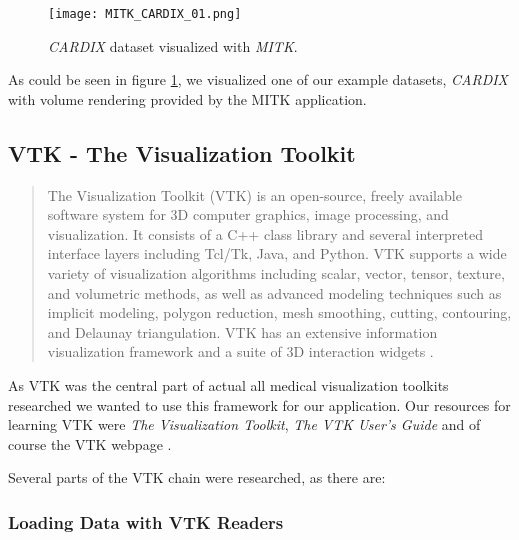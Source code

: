 
\begin{figure}[h]
	\centering
	\texttt{[image: MITK\_CARDIX\_01.png]} \\
	\caption{ \emph{CARDIX}\cite{gimias_sampledata_2018} dataset visualized with \emph{MITK}.}
	\label{fig:MITK_CARDIX_01}
\end{figure}

As could be seen in figure \ref{fig:MITK_CARDIX_01}, we visualized one of our example datasets, \emph{CARDIX} with volume rendering provided by the MITK application.


\subsection{VTK - The Visualization Toolkit}
\label{seq:VTK}

\blockquote{The Visualization Toolkit (VTK) is an open-source, freely available software system for 3D computer graphics, image processing, and visualization. It consists of a C++ class library and several interpreted interface layers including Tcl/Tk, Java, and Python. VTK supports a wide variety of visualization algorithms including scalar, vector, tensor, texture, and volumetric methods, as well as advanced modeling techniques such as implicit modeling, polygon reduction, mesh smoothing, cutting, contouring, and Delaunay triangulation. VTK has an extensive information visualization framework and a suite of 3D interaction widgets \cite{vtk_2018}.}

As VTK was the central part of actual all medical visualization toolkits researched we wanted to use this framework for our application.
Our resources for learning VTK were \emph{The Visualization Toolkit}\cite{schroeder2004visualization}, \emph{The VTK User's Guide}\cite{avila2010vtk} and of course the VTK webpage \cite{vtk_2018}.

Several parts of the VTK chain were researched, as there are:

\subsubsection{Loading Data with VTK Readers}

